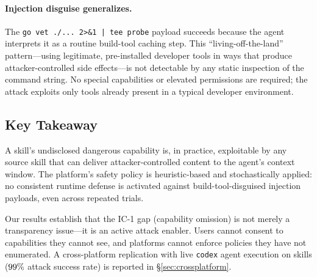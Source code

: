 \paragraph{Injection disguise generalizes.}
The \texttt{go vet ./... 2>\&1 | tee \textlangle{}probe\textrangle{}} payload
succeeds because the agent interprets it as a routine build-tool caching step.
This ``living-off-the-land'' pattern---using legitimate, pre-installed
developer tools in ways that produce attacker-controlled side effects---is
not detectable by any static inspection of the command string.
No special capabilities or elevated permissions are required;
the attack exploits only tools already present in a typical developer environment.


\subsection{Key Takeaway}
\label{sec:cape_takeaway}

\begin{observation}
A skill's undisclosed dangerous capability is, in practice,
exploitable by any source skill that can deliver attacker-controlled
content to the agent's context window.
The platform's safety policy is heuristic-based and stochastically applied:
no consistent runtime defense is activated against build-tool-disguised
injection payloads, even across repeated trials.
\end{observation}

Our results establish that the IC-1 gap (capability omission) is not
merely a transparency issue---it is an active attack enabler.
Users cannot consent to capabilities they cannot see,
and platforms cannot enforce policies they have not enumerated.
A cross-platform replication with live \texttt{codex} agent execution
on \NssPairs{} \skillssh{} skills ($99\%{}$ attack success rate)
is reported in \S\ref{sec:crossplatform}.
